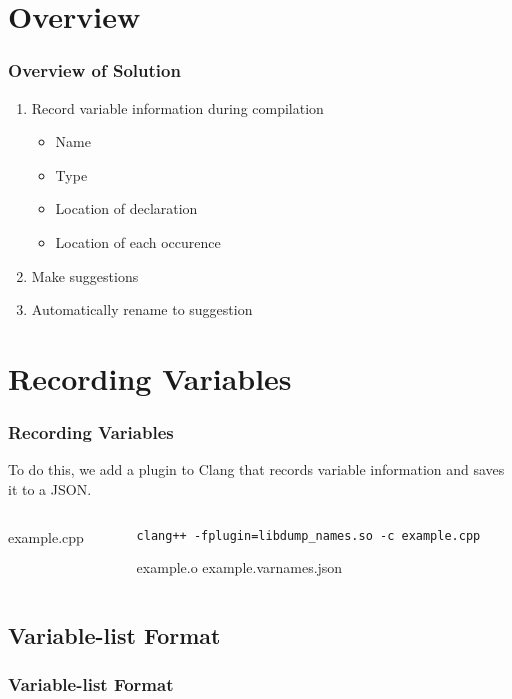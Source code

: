\documentclass[12pt]{beamer}
\begin{document}
\section{Overview}
\begin{frame}
	\frametitle{Overview of Solution}
	\begin{enumerate}
		\item Record variable information during compilation
		\begin{itemize}
			\item Name
			\item Type
			\item Location of declaration
			\item Location of each occurence
		\end{itemize}
		\item Make suggestions
		\item Automatically rename to suggestion
	\end{enumerate}
\end{frame}
\section{Recording Variables}
\begin{frame}
	\frametitle{Recording Variables}
	To do this, we add a plugin to Clang that records variable information and
	saves it to a JSON.
	\begin{columns}
		\begin{column}{0.50\textwidth}
			
					{example.cpp}
		\end{column}
		\begin{column}{0.35\textwidth}
			\lstset{breaklines=true}
			\lstinline|clang++ -fplugin=libdump_names.so -c example.cpp|
			\lstset{breaklines=false}

			\textrightarrow example.o
			\textrightarrow example.varnames.json
		\end{column}
	\end{columns}
\end{frame}
\subsection{Variable-list Format}
\begin{frame}
	\frametitle{Variable-list Format}
	
\end{frame}
\end{document}
